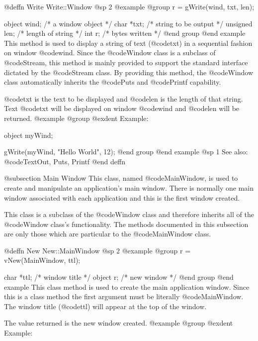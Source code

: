@deffn {Write} Write::Window
@sp 2
@example
@group
r = gWrite(wind, txt, len);

object   wind;  /*  a window object       */
char    *txt;   /*  string to be output   */
unsigned len;   /*  length of string      */
int      r;     /*  bytes written         */
@end group
@end example
This method is used to display a string of text (@code{txt}) in a sequential
fashion on window @code{wind}.  Since the @code{Window} class is a subclass
of @code{Stream}, this method is mainly provided to support the standard
interface dictated by the @code{Stream} class.  By providing this method,
the @code{Window} class automatically inherits the @code{Puts} and
@code{Printf} capability.

@code{txt} is the text to be displayed and @code{len} is the length of that
string.  Text @code{txt} will be displayed on window @code{wind} and
@code{len} will be returned.
@example
@group
@exdent Example:

object  myWind;

gWrite(myWind, "Hello World\n", 12);
@end group
@end example
@sp 1
See also:  @code{TextOut, Puts, Printf}
@end deffn











@subsection Main Window
This class, named @code{MainWindow}, is used to create and manipulate an
application's main window.  There is normally one main window associated
with each application and this is the first window created.

This class is a subclass of the @code{Window} class and therefore
inherits all of the @code{Window} class's functionality.  The methods
documented in this subsection are only those which are particular
to the @code{MainWindow} class.



@deffn {New} New::MainWindow
@sp 2
@example
@group
r = vNew(MainWindow, ttl);

char    *ttl;   /*  window title  */
object  r;      /*  new window    */
@end group
@end example
This class method is used to create the main application window.
Since this is a class method the first argument must be literally
@code{MainWindow}.  The window title (@code{ttl}) will appear at
the top of the window.

The value returned is the new window created.
@example
@group
@exdent Example:

